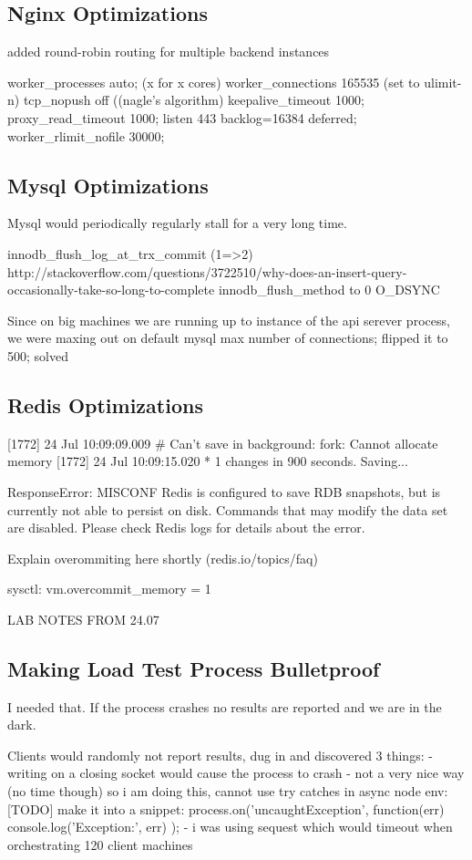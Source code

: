 \documentclass{uvamscse}
\begin{document}
\subsection{Nginx Optimizations}
added round-robin routing for multiple backend instances

worker\_processes auto; (x for x cores)
worker\_connections 165535 (set to ulimit-n)
tcp\_nopush off ((nagle’s algorithm)
keepalive\_timeout 1000;
proxy\_read\_timeout 1000;
listen 443 backlog=16384 deferred;
worker\_rlimit\_nofile 30000;

\subsection{Mysql Optimizations}
Mysql would periodically regularly stall for a very long time.

innodb\_flush\_log\_at\_trx\_commit (1=>2)
http://stackoverflow.com/questions/3722510/why-does-an-insert-query-occasionally-take-so-long-to-complete
innodb\_flush\_method to 0 O\_DSYNC

Since on big machines we are running up to instance of the api serever process, we were maxing out on default mysql max number of connections; flipped it to 500; solved

\subsection{Redis Optimizations}
[1772] 24 Jul 10:09:09.009 \# Can't save in background: fork: Cannot allocate memory
[1772] 24 Jul 10:09:15.020 * 1 changes in 900 seconds. Saving...

ResponseError: MISCONF Redis is configured to save RDB snapshots, but is currently not able to persist on disk. Commands that may modify the data set are disabled. Please check Redis logs for details about the error.

Explain overommiting here shortly (redis.io/topics/faq)

sysctl: vm.overcommit\_memory = 1

LAB NOTES FROM 24.07

\subsection{Making Load Test Process Bulletproof}
I needed that. If the process crashes no results are reported and we are in the dark.

Clients would randomly not report results, dug in and discovered 3 things:
  - writing on a closing socket would cause the process to crash
  - not a very nice way (no time though) so i am doing this, cannot use try {}catches in async node env:
  [TODO] make it into a snippet:
  process.on('uncaughtException', function(err) {
    console.log('Exception:', err)
});
  - i was using sequest which would timeout when orchestrating 120 client machines
\end{document}
